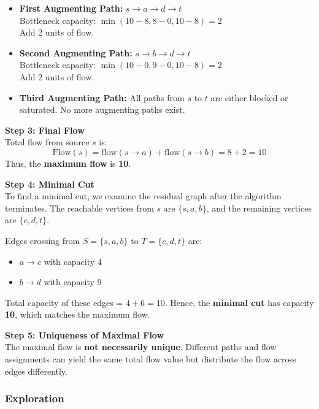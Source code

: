 \documentclass{article}
\theoremstyle{theorem}
\theoremstyle{definition}
\theoremstyle{remark}
\begin{document}
\begin{itemize}
    \item \textbf{First Augmenting Path:} $s \rightarrow a \rightarrow d \rightarrow t$\\
    Bottleneck capacity: $\min(10 - 8, 8 - 0, 10 - 8) = 2$\\
    Add 2 units of flow.

    \item \textbf{Second Augmenting Path:} $s \rightarrow b \rightarrow d \rightarrow t$\\
    Bottleneck capacity: $\min(10 - 0, 9 - 0, 10 - 8) = 2$\\
    Add 2 units of flow.

    \item \textbf{Third Augmenting Path:} All paths from $s$ to $t$ are either blocked or saturated. No more augmenting paths exist.
\end{itemize}

\textbf{Step 3: Final Flow}\\
Total flow from source $s$ is:
\[\text{Flow}(s) = \text{flow}(s \rightarrow a) + \text{flow}(s \rightarrow b) = 8 + 2 = 10\]
Thus, the \textbf{maximum flow} is \textbf{10}.

\textbf{Step 4: Minimal Cut}\\
To find a minimal cut, we examine the residual graph after the algorithm terminates. The reachable vertices from $s$ are $\{s, a, b\}$, and the remaining vertices are $\{c, d, t\}$.

Edges crossing from $S = \{s, a, b\}$ to $T = \{c, d, t\}$ are:
\begin{itemize}
    \item $a \rightarrow c$ with capacity 4
    \item $b \rightarrow d$ with capacity 9
\end{itemize}
Total capacity of these edges = $4 + 6 = 10$. Hence, the \textbf{minimal cut} has capacity \textbf{10}, which matches the maximum flow.

\textbf{Step 5: Uniqueness of Maximal Flow}\\
The maximal flow is \textbf{not necessarily unique}. Different paths and flow assignments can yield the same total flow value but distribute the flow across edges differently.


\subsubsection{Exploration}
\end{document}
